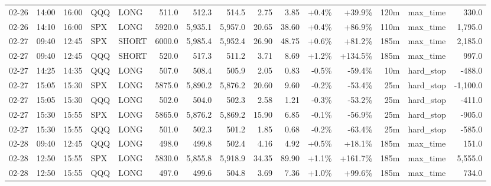 \documentclass[11pt,a4paper,twoside]{article}
\begin{document}
\begin{landscape}
\begin{center}
\begin{longtable}{>{\color{txtmain}}l l l l l r r r r r r r r >{\color{txtmain}}l r}
02-26 & 14:00 & 16:00 & QQQ & LONG & 511.0 & 512.3 & 514.5 & 2.75 & 3.85 & \textcolor{wingreen}{+0.4\%} & \textcolor{wingreen}{+39.9\%} & 120m & max\_time & \textcolor{wingreen}{330.0} \\
02-26 & 14:10 & 16:00 & SPX & LONG & 5920.0 & 5,935.1 & 5,957.0 & 20.65 & 38.60 & \textcolor{wingreen}{+0.4\%} & \textcolor{wingreen}{+86.9\%} & 110m & max\_time & \textcolor{wingreen}{1,795.0} \\
02-27 & 09:40 & 12:45 & SPX & SHORT & 6000.0 & 5,985.4 & 5,952.4 & 26.90 & 48.75 & \textcolor{wingreen}{+0.6\%} & \textcolor{wingreen}{+81.2\%} & 185m & max\_time & \textcolor{wingreen}{2,185.0} \\
02-27 & 09:40 & 12:45 & QQQ & SHORT & 520.0 & 517.3 & 511.2 & 3.71 & 8.69 & \textcolor{wingreen}{+1.2\%} & \textcolor{wingreen}{+134.5\%} & 185m & max\_time & \textcolor{wingreen}{997.0} \\
02-27 & 14:25 & 14:35 & QQQ & LONG & 507.0 & 508.4 & 505.9 & 2.05 & 0.83 & \textcolor{lossred}{-0.5\%} & \textcolor{lossred}{-59.4\%} & 10m & hard\_stop & \textcolor{lossred}{-488.0} \\
02-27 & 15:05 & 15:30 & SPX & LONG & 5875.0 & 5,890.2 & 5,876.2 & 20.60 & 9.60 & \textcolor{lossred}{-0.2\%} & \textcolor{lossred}{-53.4\%} & 25m & hard\_stop & \textcolor{lossred}{-1,100.0} \\
02-27 & 15:05 & 15:30 & QQQ & LONG & 502.0 & 504.0 & 502.3 & 2.58 & 1.21 & \textcolor{lossred}{-0.3\%} & \textcolor{lossred}{-53.2\%} & 25m & hard\_stop & \textcolor{lossred}{-411.0} \\
02-27 & 15:30 & 15:55 & SPX & LONG & 5865.0 & 5,876.2 & 5,869.2 & 15.90 & 6.85 & \textcolor{lossred}{-0.1\%} & \textcolor{lossred}{-56.9\%} & 25m & hard\_stop & \textcolor{lossred}{-905.0} \\
02-27 & 15:30 & 15:55 & QQQ & LONG & 501.0 & 502.3 & 501.2 & 1.85 & 0.68 & \textcolor{lossred}{-0.2\%} & \textcolor{lossred}{-63.4\%} & 25m & hard\_stop & \textcolor{lossred}{-585.0} \\
02-28 & 09:40 & 12:45 & QQQ & LONG & 498.0 & 499.8 & 502.4 & 4.16 & 4.92 & \textcolor{wingreen}{+0.5\%} & \textcolor{wingreen}{+18.1\%} & 185m & max\_time & \textcolor{wingreen}{151.0} \\
02-28 & 12:50 & 15:55 & SPX & LONG & 5830.0 & 5,855.8 & 5,918.9 & 34.35 & 89.90 & \textcolor{wingreen}{+1.1\%} & \textcolor{wingreen}{+161.7\%} & 185m & max\_time & \textcolor{wingreen}{5,555.0} \\
02-28 & 12:50 & 15:55 & QQQ & LONG & 497.0 & 499.6 & 504.8 & 3.69 & 7.36 & \textcolor{wingreen}{+1.0\%} & \textcolor{wingreen}{+99.6\%} & 185m & max\_time & \textcolor{wingreen}{734.0} \\

\end{longtable}
\end{center}
\end{landscape}
\end{document}
